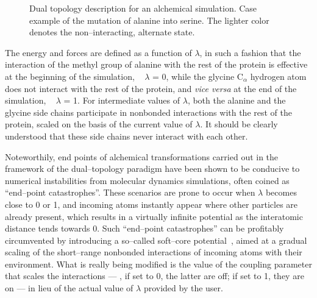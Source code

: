 \begin{figure}[ht]
  \caption{Dual topology description for an alchemical simulation.
           Case example of the mutation of alanine into serine.
           The lighter color denotes the non--interacting, alternate
           state.
           \label{fig:dual_top}}
\end{figure}


The energy and forces are defined as a function of $\lambda$, in such a fashion
that the interaction of the methyl group of alanine with the rest of the
protein is effective at the beginning of the simulation, \ie~ $\lambda$ = 0,
while the glycine C$_\alpha$ hydrogen atom does not interact with the rest of
the protein, and {\it vice versa} at the end of the simulation, \ie~ $\lambda$
= 1. For intermediate values of $\lambda$, both the alanine and the glycine
side chains participate in nonbonded interactions with the rest of the protein,
scaled on the basis of the current value of $\lambda$. It should be clearly
understood that these side chains never interact with each other.


Noteworthily, end points of alchemical transformations carried out in the
framework of the dual--topology paradigm have been shown to be conducive to
numerical instabilities from molecular dynamics simulations, often coined as ``end--point
catastrophes''. These scenarios are prone to occur when $\lambda$ becomes close
to 0 or 1, and incoming atoms instantly appear where other particles are
already present, which results in a virtually infinite potential as the
interatomic distance tends towards 0. Such ``end--point catastrophes'' can be
profitably circumvented by introducing a so--called soft--core
potential~\cite{Beutler1994}, aimed at a gradual scaling of the short--range
nonbonded interactions of incoming atoms with their environment.  
What is really being modified is the value of the coupling parameter that
scales the interactions --- \ie, if set to 0, the latter are off; if set to 1,
they are on --- in lieu of the actual value of $\lambda$ provided by the user.


